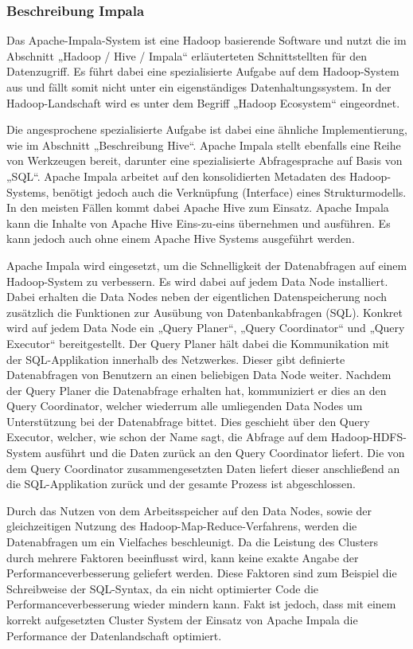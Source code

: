 \subsubsection{Beschreibung Impala}
\label{subsubsec:impala_beschreibung}
Das Apache\hyp{}Impala\hyp{}System ist eine Hadoop basierende Software und
nutzt die im Abschnitt „Hadoop / Hive / Impala“ erläuterteten Schnittstellten
für den Datenzugriff. Es führt dabei eine spezialisierte Aufgabe auf dem
Hadoop\hyp{}System aus und fällt somit nicht unter ein eigenständiges
Datenhaltungssystem. In der Hadoop\hyp{}Landschaft wird es unter dem Begriff
„Hadoop Ecosystem“ eingeordnet.

Die angesprochene spezialisierte Aufgabe ist dabei eine ähnliche
Implementierung, wie im Abschnitt „Beschreibung Hive“. Apache
Impala stellt ebenfalls eine Reihe von Werkzeugen bereit, darunter eine
spezialisierte Abfragesprache auf Basis von „\gls{SQL}“. Apache Impala arbeitet
auf den konsolidierten Metadaten des Hadoop\hyp{}Systems, benötigt jedoch auch
die Verknüpfung (Interface) eines Strukturmodells. In den meisten Fällen kommt
dabei Apache Hive zum Einsatz. Apache Impala kann die Inhalte von Apache Hive
Eins\hyp{}zu\hyp{}eins übernehmen und ausführen. Es kann jedoch auch ohne einem
Apache Hive Systems ausgeführt werden.

Apache Impala wird eingesetzt, um die Schnelligkeit der Datenabfragen auf einem
Hadoop\hyp{}System zu verbessern. Es wird dabei auf jedem Data Node
installiert. Dabei erhalten die Data Nodes neben der eigentlichen
Datenspeicherung noch zusätzlich die Funktionen zur Ausübung von
Datenbankabfragen (\gls{SQL}). Konkret wird auf jedem Data Node ein
„Query Planer“, „Query Coordinator“ und „Query Executor“ bereitgestellt. Der
Query Planer hält dabei die Kommunikation mit der \gls{SQL}\hyp{}Applikation
innerhalb des Netzwerkes. Dieser gibt definierte Datenabfragen von Benutzern an
einen beliebigen Data Node weiter. Nachdem der Query Planer die Datenabfrage
erhalten hat, kommuniziert er dies an den Query Coordinator, welcher wiederrum
alle umliegenden Data Nodes um Unterstützung bei der Datenabfrage bittet. Dies
geschieht über den Query Executor, welcher, wie schon der Name sagt, die
Abfrage auf dem Hadoop\hyp{}HDFS\hyp{}System ausführt und die Daten zurück an
den Query Coordinator liefert. Die von dem Query Coordinator zusammengesetzten
Daten liefert dieser anschließend an die \gls{SQL}\hyp{}Applikation zurück und
der gesamte Prozess ist abgeschlossen.

Durch das Nutzen von dem Arbeitsspeicher auf den Data Nodes, sowie der
gleichzeitigen Nutzung des Hadoop\hyp{}Map\hyp{}Reduce\hyp{}Verfahrens, werden
die Datenabfragen um ein Vielfaches beschleunigt. Da die Leistung des Clusters
durch mehrere Faktoren beeinflusst wird, kann keine exakte Angabe der
Performanceverbesserung geliefert werden. Diese Faktoren sind zum Beispiel die
Schreibweise der \gls{SQL}\hyp{}Syntax, da ein nicht optimierter Code die
Performanceverbesserung wieder mindern kann. Fakt ist jedoch, dass mit einem
korrekt aufgesetzten Cluster System der Einsatz von Apache Impala die
Performance der Datenlandschaft optimiert.
\nl%

